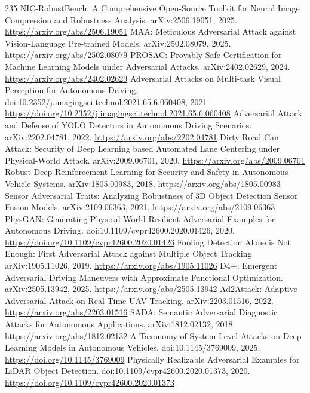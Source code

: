 \documentclass[11pt]{article}
\begin{document}
\begin{thebibliography}{235}
 NIC-RobustBench: A Comprehensive Open-Source Toolkit for Neural Image Compression and Robustness Analysis. arXiv:2506.19051, 2025. \url{https://arxiv.org/abs/2506.19051}
 MAA: Meticulous Adversarial Attack against Vision-Language Pre-trained Models. arXiv:2502.08079, 2025. \url{https://arxiv.org/abs/2502.08079}
 PROSAC: Provably Safe Certification for Machine Learning Models under Adversarial Attacks. arXiv:2402.02629, 2024. \url{https://arxiv.org/abs/2402.02629}
 Adversarial Attacks on Multi-task Visual Perception for Autonomous Driving. doi:10.2352/j.imagingsci.technol.2021.65.6.060408, 2021. \url{https://doi.org/10.2352/j.imagingsci.technol.2021.65.6.060408}
 Adversarial Attack and Defense of YOLO Detectors in Autonomous Driving Scenarios. arXiv:2202.04781, 2022. \url{https://arxiv.org/abs/2202.04781}
 Dirty Road Can Attack: Security of Deep Learning based Automated Lane Centering under Physical-World Attack. arXiv:2009.06701, 2020. \url{https://arxiv.org/abs/2009.06701}
 Robust Deep Reinforcement Learning for Security and Safety in Autonomous Vehicle Systems. arXiv:1805.00983, 2018. \url{https://arxiv.org/abs/1805.00983}
 Sensor Adversarial Traits: Analyzing Robustness of 3D Object Detection Sensor Fusion Models. arXiv:2109.06363, 2021. \url{https://arxiv.org/abs/2109.06363}
 PhysGAN: Generating Physical-World-Resilient Adversarial Examples for Autonomous Driving. doi:10.1109/cvpr42600.2020.01426, 2020. \url{https://doi.org/10.1109/cvpr42600.2020.01426}
 Fooling Detection Alone is Not Enough: First Adversarial Attack against Multiple Object Tracking. arXiv:1905.11026, 2019. \url{https://arxiv.org/abs/1905.11026}
 D4+: Emergent Adversarial Driving Maneuvers with Approximate Functional Optimization. arXiv:2505.13942, 2025. \url{https://arxiv.org/abs/2505.13942}
 Ad2Attack: Adaptive Adversarial Attack on Real-Time UAV Tracking. arXiv:2203.01516, 2022. \url{https://arxiv.org/abs/2203.01516}
 SADA: Semantic Adversarial Diagnostic Attacks for Autonomous Applications. arXiv:1812.02132, 2018. \url{https://arxiv.org/abs/1812.02132}
 A Taxonomy of System-Level Attacks on Deep Learning Models in Autonomous Vehicles. doi:10.1145/3769009, 2025. \url{https://doi.org/10.1145/3769009}
 Physically Realizable Adversarial Examples for LiDAR Object Detection. doi:10.1109/cvpr42600.2020.01373, 2020. \url{https://doi.org/10.1109/cvpr42600.2020.01373}

\end{thebibliography}
\end{document}
